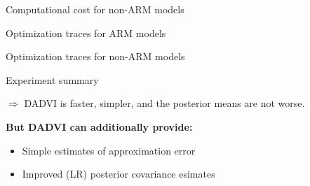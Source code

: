\documentclass[8pt]{beamer}\usepackage[]{graphicx}\usepackage[]{color}
\begin{document}

\begin{frame}{Computational cost for non-ARM models}
    \RuntimeNonARM{}
\end{frame}


\begin{frame}{Optimization traces for ARM models}
    \TracesARM{}
\end{frame}


\begin{frame}{Optimization traces for non-ARM models}
    \TracesNonARM{}
\end{frame}



\begin{frame}{Experiment summary}

$\Rightarrow$ DADVI is faster, simpler, and the posterior means are not worse.

\vspace{3em}
\textbf{But DADVI can additionally provide:}
%
\begin{itemize}
\item Simple estimates of approximation error
\item Improved (LR) posterior covariance esimates
\end{itemize}
%

\end{frame}

\end{document}
